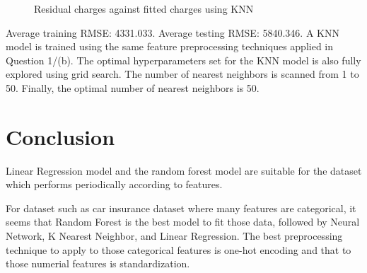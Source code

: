 \documentclass{article}
\begin{document}
\begin{figure}[!htbp]
\centering
{}
\caption{Residual charges against fitted charges using KNN} \label{3_4_b_KNN_2}
\end{figure}

Average training RMSE: 4331.033.\newline
\indent Average testing RMSE: 5840.346.\newline
\indent A KNN model is trained using the same feature preprocessing techniques applied in Question 1/(b). The optimal hyperparameters set for the KNN model is also fully explored using grid search. The number of nearest neighbors is scanned from 1 to 50. Finally, the optimal number of nearest neighbors is 50.\bigbreak

\section{Conclusion}

Linear Regression model and the random forest model are suitable for the dataset which performs periodically according to features. 

For dataset such as car insurance dataset where many features are categorical, it seems that Random Forest is the best model to fit those data, followed by Neural Network, K Nearest Neighbor, and Linear Regression. The best preprocessing technique to apply to those categorical features is one-hot encoding and that to those numerial features is standardization.
\end{document}
